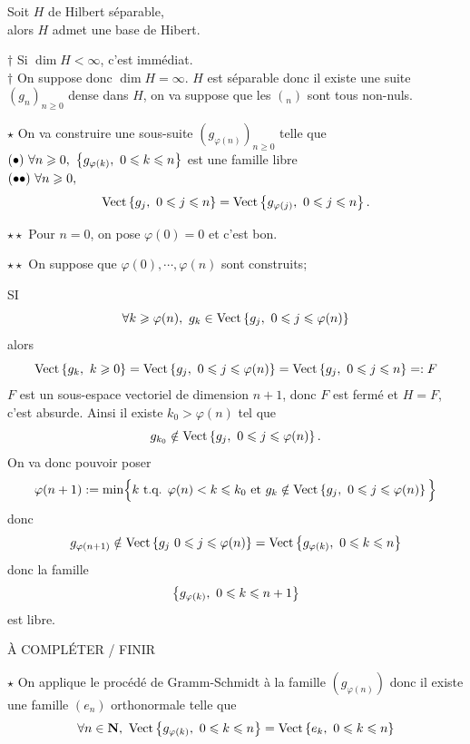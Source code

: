 \documentclass[a4paper,11pt, twoside]{article}
\begin{document}
\begin{Th}
  Soit $H$ de Hilbert séparable,\\
  
  alors $H$ admet une base de Hibert.
\end{Th}


\begin{Proof}
  $\dagger$ Si $\dim H<\infty$, c'est immédiat.\\

  $\dagger$ On suppose donc $\dim H=\infty$. $H$ est séparable donc il existe une suite $(g_n)_{n\geqslant 0}$ dense dans $H$, on va suppose que les $(_n)$ sont tous non-nuls. 

  $\star$ On va construire une sous-suite $(g_{\varphi(n)})_{n\geqslant 0}$ telle que\\
  $\Bullet\ \forall n\geqslant 0,\ \ens{g_{\varphi(k)},\ 0\leqslant k\leqslant n}$ est une famille libre\\
  $(\bullet\bullet)\ \forall n\geqslant 0,$
  $$\mathrm{Vect}\left\{g_j,\ 0\leqslant j\leqslant n\right\}=\mathrm{Vect}\left\{g_{\varphi(j)},\ 0\leqslant j\leqslant n\right\}.$$

  $\star\star$ Pour $n=0$, on pose $\varphi(0)=0$ et c'est bon.

  $\star\star$ On suppose que $\varphi(0),\cdots,\varphi(n)$ sont construits;

  SI 
  $$\forall k\geqslant \varphi(n),\ g_k\in \mathrm{Vect}\ens{g_j,\ 0\leqslant j\leqslant \varphi(n)}$$ 
  alors
  $$\mathrm{Vect}\left\{g_k,\ k\geqslant 0\right\}=\mathrm{Vect}\left\{g_j,\ 0\leqslant j\leqslant \varphi(n)\right\}=\mathrm{Vect}\left\{g_j,\ 0\leqslant j\leqslant n\right\}=:F$$
  $F$ est un sous-espace vectoriel de dimension $n+1$, donc $F$ est fermé et $H=F$, c'est absurde. Ainsi il existe $k_0>\varphi(n)$ tel que 
  $$g_{k_0}\notin \mathrm{Vect}\left\{g_j,\ 0\leqslant j\leqslant \varphi(n)\right\}.$$
  On va donc pouvoir poser 
  $$\varphi(n+1):=\mathrm{min}\Big\{k\text{ t.q. }\varphi(n)<k\leqslant k_0\text{ et }g_{k}\notin \mathrm{Vect}\left\{g_j,\ 0\leqslant j\leqslant \varphi(n)\right\}\Big\}$$
  donc
  $$g_{\varphi(n+1)}\notin \mathrm{Vect}\ens{g_j\ 0\leqslant j\leqslant \varphi(n)}=\mathrm{Vect}\ens{g_{\varphi(k)},\ 0\leqslant k\leqslant n}$$
  donc la famille 
  $$\left\{g_{\varphi(k)},\ 0\leqslant k\leqslant n+1\right\}$$
  est libre.
  
  À COMPLÉTER / FINIR

  $\star$ On applique le procédé de Gramm-Schmidt à la famille $(g_{\varphi(n)})$ donc il existe une famille $(e_n)$ orthonormale telle que 
  $$\forall n\in \N,\ \mathrm{Vect}\ens{g_{\varphi(k)},\ 0\leqslant k\leqslant n}= \mathrm{Vect}\ens{e_k,\ 0\leqslant k\leqslant n}$$


\end{Proof}
\end{document}
